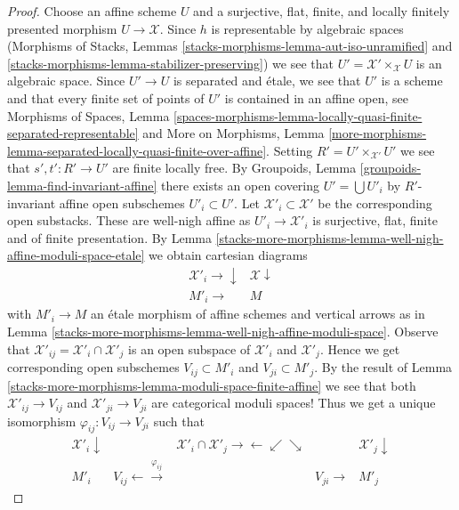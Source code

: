 \begin{proof}
Choose an affine scheme $U$ and a surjective, flat, finite, and
locally finitely presented morphism $U \to \mathcal{X}$.
Since $h$ is representable by algebraic spaces
(Morphisms of Stacks, Lemmas
\ref{stacks-morphisms-lemma-aut-iso-unramified} and
\ref{stacks-morphisms-lemma-stabilizer-preserving})
we see that $U' = \mathcal{X}' \times_\mathcal{X} U$ is
an algebraic space. Since $U' \to U$ is separated and \'etale,
we see that $U'$ is a scheme and that every finite set of points
of $U'$ is contained in an affine open, see
Morphisms of Spaces, Lemma
\ref{spaces-morphisms-lemma-locally-quasi-finite-separated-representable}
and
More on Morphisms, Lemma
\ref{more-morphisms-lemma-separated-locally-quasi-finite-over-affine}.
Setting $R' = U' \times_{\mathcal{X}'} U'$ we see
that $s', t' : R' \to U'$ are finite locally free.
By Groupoids, Lemma \ref{groupoids-lemma-find-invariant-affine}
there exists an open covering $U' = \bigcup U'_i$ by
$R'$-invariant affine open subschemes $U'_i \subset U'$.
Let $\mathcal{X}'_i \subset \mathcal{X}'$ be the corresponding
open substacks. These are well-nigh affine as $U'_i \to \mathcal{X}'_i$
is surjective, flat, finite and of finite presentation. By
Lemma \ref{stacks-more-morphisms-lemma-well-nigh-affine-moduli-space-etale}
we obtain cartesian diagrams
$$
\begin{array}{cc}\mathcal{X}'_i \longrightarrow\downarrow & \mathcal{X} \downarrow \\ M'_i \longrightarrow & M\end{array}
$$
with $M'_i \to M$ an \'etale morphism of affine schemes
and vertical arrows as in
Lemma \ref{stacks-more-morphisms-lemma-well-nigh-affine-moduli-space}.
Observe that
$\mathcal{X}'_{ij} = \mathcal{X}'_i \cap \mathcal{X}'_j$
is an open subspace of $\mathcal{X}'_i$ and $\mathcal{X}'_j$.
Hence we get corresponding open subschemes
$V_{ij} \subset M'_i$ and $V_{ji} \subset M'_j$.
By the result of
Lemma \ref{stacks-more-morphisms-lemma-moduli-space-finite-affine}
we see that both
$\mathcal{X}'_{ij} \to V_{ij}$ and
$\mathcal{X}'_{ji} \to V_{ji}$ are categorical moduli spaces!
Thus we get a unique isomorphism $\varphi_{ij} : V_{ij} \to V_{ji}$
such that
$$
\begin{array}{ccccc}\mathcal{X}'_i \downarrow &  & \mathcal{X}'_i \cap \mathcal{X}'_j \longrightarrow\longleftarrow\swarrow\searrow &  & \mathcal{X}'_j \downarrow \\ M'_i & V_{ij} \longleftarrow\overset{\varphi_{ij}}{\longrightarrow} &  & V_{ji} \longrightarrow & M'_j\end{array}
$$
\end{proof}
